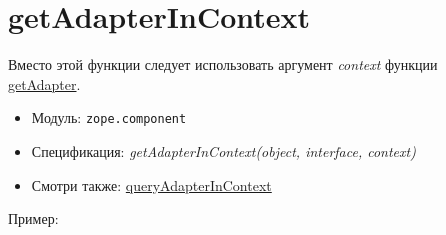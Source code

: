 \documentclass[a4paper,openany,twoside,draft]{book}
\providecommand*{\DUroletitlereference}[1]{\textsl{#1}}
\begin{document}
\section*{getAdapterInContext%
  \label{getadapterincontext}%
}

Вместо этой функции следует использовать аргумент \DUroletitlereference{context} функции \hyperref[getadapter]{getAdapter}.

\begin{itemize}

\item Модуль: \texttt{zope.component}

\item Спецификация: \DUroletitlereference{getAdapterInContext(object, interface, context)}

\item Смотри также: \hyperref[queryadapterincontext]{queryAdapterInContext}

\end{itemize}

Пример:
\end{document}
